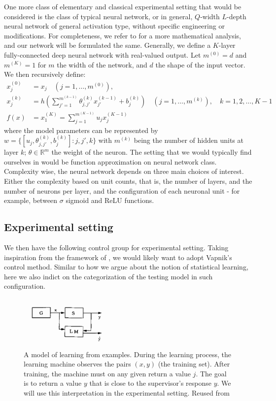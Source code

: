 \documentclass[10pt,oneside,oldfontcommands,dvipsnames,article]{memoir}
\begin{document}
One more class of elementary and classical experimental setting that would be considered is the class of typical neural network, or in general, $Q$-width $L$-depth neural network of general activation type, without specific engineering or modifications. For completeness, we refer to \cite{zhang2023mathematical} for a more mathematical analysis, and our network will be formulated the same. Generally, we define a $K$-layer fully-connected deep neural network with real-valued output. Let $m^{(0)}=d$ and $m^{(K)}=1$ for $m$ the width of the network, and $d$ the shape of the input vector. We then recursively define: 
\begin{align}
    x_{j}^{(0)} &= x_{j} \quad (j=1,\dots,m^{(0)}),\\ 
    x_{j}^{(k)} &= h\left(\sum^{m^{(k-1)}}_{j'=1} \theta_{j,j'}^{(k)}x_{j'}^{(k-1)}+ b_{j}^{(k)}\right)\quad (j=1,\dots,m^{(k)}), \quad k = 1,2,\dots,K-1\\
    f(x) & = x_{1}^{(K)} = \sum^{m^{(K-1)}}_{j=1} u_{j}x_{j}^{(K-1)}
\end{align}
where the model parameters can be represented by $w=\{[u_{j}, \theta_{j,j'}^{(k)}, b_{j}^{(k)}]: j,j',k\}$ with $m^{(k)}$ being the number of hidden units at layer $k$; $\theta\in \mathbb{R}^{m}$ the weight of the neuron. The setting that we would typically find ourselves in would be function approximation on neural network class. Complexity wise, the neural network depends on three main choices of interest. Either the complexity based on unit counts, that is, the number of layers, and the number of neurons per layer, and the configuration of each neuronal unit - for example, between $\sigma$ sigmoid and ReLU functions. 

\subsection{Experimental setting}

We then have the following control group for experimental setting. Taking inspiration from the framework of \cite{Vapnik1999-VAPTNO}, we would likely want to adopt Vapnik's control method. Similar to how we argue about the notion of statistical learning, here we also indict on the categorization of the testing model in such configuration. 
\begin{figure}[htb]
    \centering
    \includegraphics[width=0.4\textwidth]{img/vapniksetting.png}
    \caption{A model of learning from examples. During the learning process, the learning machine observes the pairs $(x, y)$ (the training set). After training, the machine must on any given return a value $j$. The goal is to return a value $y$ that is close to the supervisor's response $y$. We will use this interpretation in the experimental setting. Reused from \cite{Vapnik1999-VAPTNO}}
\end{figure}
\end{document}
